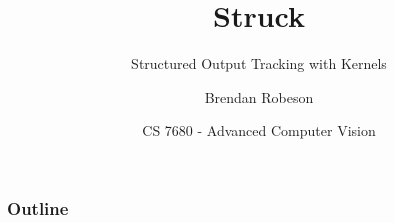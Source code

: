 \documentclass[mathserif]{beamer}
\title{Struck}
\subtitle{Structured Output Tracking with Kernels}
\author{Brendan Robeson}
\date[CS 7680]{CS 7680 - Advanced Computer Vision}
\institute{Utah State University}
\begin{document}
\begin{frame}
    \titlepage
\end{frame}

\begin{frame}
    \frametitle{Outline}
    \tableofcontents
\end{frame}





\end{document}
